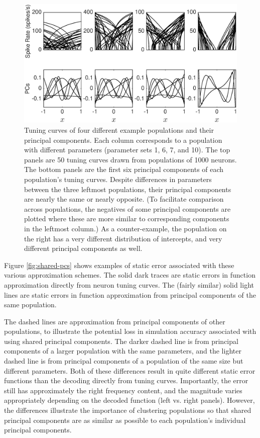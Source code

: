 \documentclass[]{article}
\begin{document}
\begin{figure}
\centering{}
\includegraphics[scale=0.4]{PC-examples.eps}
\caption{Tuning curves of four different example populations and their principal components. Each column corresponds to a population with different parameters (parameter sets 1, 6, 7, and 10). The top panels are 50 tuning curves drawn from populations of 1000 neurons. The bottom panels are the first six principal components of each population's tuning curves. Despite differences in parameters between the three leftmost populations, their principal components are nearly the same or nearly opposite. (To facilitate comparison across populations, the negatives of some principal components are plotted where these are more similar to corresponding components in the leftmost column.) As a counter-example, the population on the right has a very different distribution of intercepts, and very different principal components as well. }
\label{fig:pc-examples}
\end{figure}

Figure \ref{fig:shared-pcs} shows examples of static error associated with these various approximation schemes. The solid dark traces are static errors in function approximation directly from neuron tuning curves. The (fairly similar) solid light lines are static errors in function approximation from principal components of the same population. 

The dashed lines are approximation from principal components of other populations, to illustrate the potential loss in simulation accuracy associated with using shared principal components. The darker dashed line is from principal components of a larger population with the same parameters, and the lighter dashed line is from principal components of a population of the same size but different parameters. Both of these differences result in quite different static error functions than the decoding directly from tuning curves. Importantly, the error still has approximately the right frequency content, and the magnitude varies appropriately depending on the decoded function (left vs. right panels). However, the differences illustrate the importance of clustering populations so that shared principal components are as similar as possible to each population's individual principal components.   
\end{document}
